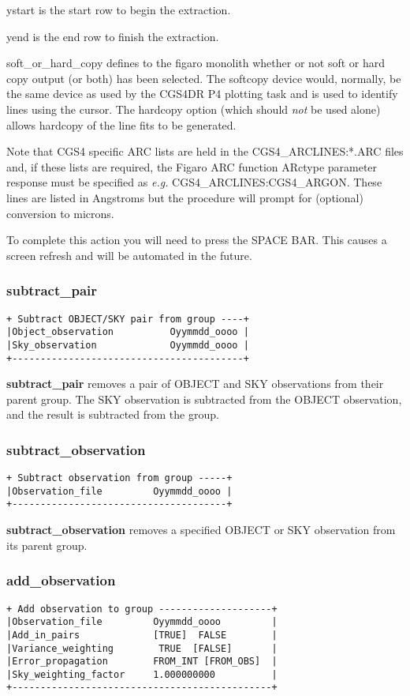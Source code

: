 {{\sf ystart} is the start row to begin the extraction.

{\sf yend} is the end row to finish the extraction.

{\sf soft\_or\_hard\_copy} defines to the figaro monolith whether or
not soft or hard copy output (or both) has been selected. The softcopy
device would, normally, be the same device as used by the CGS4DR P4 plotting
task and is used to identify lines using the cursor. The hardcopy option
(which should {\em not} be used alone) allows hardcopy of the line fits
to be generated.

Note that CGS4 specific ARC lists are held in the CGS4\_ARCLINES:*.ARC
files and, if these lists are required, the Figaro ARC function {\sf ARctype}
parameter response must be specified as {\em e.g.} 
{\sf CGS4\_ARCLINES:CGS4\_ARGON}. These lines are listed in Angstroms but
the procedure will prompt for (optional) conversion to microns.

To complete this action you will need to press the {\sf SPACE BAR}. This
causes a screen refresh and will be automated in the future.

\subsubsection{subtract\_pair}
\begin{verbatim}
+ Subtract OBJECT/SKY pair from group ----+
|Object_observation          Oyymmdd_oooo |
|Sky_observation             Oyymmdd_oooo |
+-----------------------------------------+
\end{verbatim}

{\bf subtract\_pair} removes a pair of {\sf OBJECT} and {\sf SKY}
observations from their parent group. The {\sf SKY} observation is subtracted 
from the {\sf OBJECT} observation, and the result is subtracted from the group.

\subsubsection{subtract\_observation}
\begin{verbatim}
+ Subtract observation from group -----+
|Observation_file         Oyymmdd_oooo |
+--------------------------------------+
\end{verbatim}

{\bf subtract\_observation} removes a specified {\sf OBJECT} or {\sf SKY} 
observation from its parent group.

\subsubsection{add\_observation}
\begin{verbatim}
+ Add observation to group --------------------+
|Observation_file         Oyymmdd_oooo         |
|Add_in_pairs             [TRUE]  FALSE        |
|Variance_weighting        TRUE  [FALSE]       |
|Error_propagation        FROM_INT [FROM_OBS]  |
|Sky_weighting_factor     1.000000000          |
+----------------------------------------------+
\end{verbatim}

}

